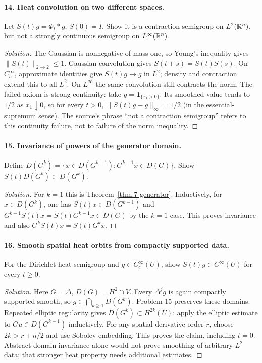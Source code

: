 \Needspace{30mm}
\paragraph{14. Heat convolution on two different spaces.}
Let $S(t)g=\Phi_t*g$, $S(0)=I$. Show it is a contraction semigroup on
$L^2(\mathbb{R}^n)$, but not a strongly continuous semigroup on $L^\infty(\mathbb{R}^n)$.
\begin{proof}[Solution]
The Gaussian is nonnegative of mass one, so Young's inequality gives
$\|S(t)\|_{2\to2}\leq1$. Gaussian convolution gives
$S(t+s)=S(t)S(s)$. On $C_c^\infty$, approximate identities give
$S(t)g\to g$ in $L^2$; density and contraction extend this to all $L^2$.
On $L^\infty$ the same convolution still contracts the norm.
The failed axiom is strong continuity: take
$g=\mathbf1_{\{x_1>0\}}$. Its smoothed value tends to $1/2$ as
$x_1\downarrow0$, so for every $t>0$,
$\|S(t)g-g\|_\infty=1/2$ (in the essential-supremum sense).
The source's phrase ``not a contraction semigroup'' refers to this
continuity failure, not to failure of the norm inequality.
\end{proof}
\Needspace{55mm}

\Needspace{30mm}
\paragraph{15. Invariance of powers of the generator domain.}
Define $D(G^k)=\{x\in D(G^{k-1}):G^{k-1}x\in D(G)\}$.
Show $S(t)D(G^k)\subset D(G^k)$.
\begin{proof}[Solution]
For $k=1$ this is Theorem~\ref{thm:7-generator}. Inductively, for
$x\in D(G^k)$, one has $S(t)x\in D(G^{k-1})$ and
$G^{k-1}S(t)x=S(t)G^{k-1}x\in D(G)$ by the $k=1$ case.
This proves invariance and also $G^kS(t)x=S(t)G^kx$.
\end{proof}

\Needspace{30mm}
\paragraph{16. Smooth spatial heat orbits from compactly supported data.}
For the Dirichlet heat semigroup and $g\in C_c^\infty(U)$, show
$S(t)g\in C^\infty(U)$ for every $t\geq0$.
\begin{proof}[Solution]
Here $G=\Delta$, $D(G)=H^2\cap V$.
Every $\Delta^jg$ is again compactly supported smooth, so
$g\in\bigcap_{k\geq1}D(G^k)$. Problem 15 preserves these domains.
Repeated elliptic regularity gives
$D(G^k)\subset H^{2k}(U)$: apply the elliptic estimate to
$Gu\in D(G^{k-1})$ inductively. For any spatial derivative order $r$,
choose $2k>r+n/2$ and use Sobolev embedding.
This proves the claim, including $t=0$. Abstract domain invariance alone
would not prove smoothing of arbitrary $L^2$ data; that stronger heat
property needs additional estimates.
\end{proof}
